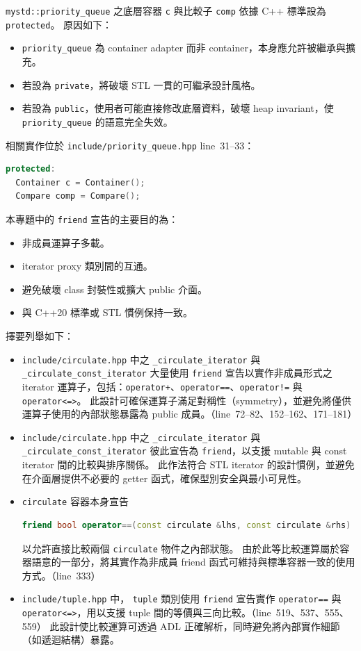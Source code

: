 \documentclass[a4paper,12pt]{article}
\begin{document}
\label{2-A-3-3}
\verb|mystd::priority_queue| 之底層容器 \verb|c| 與比較子 \verb|comp| 依據 C++ 標準設為 \verb|protected|。
原因如下：
\begin{itemize}
\item \verb|priority_queue| 為 container adapter 而非 container，本身應允許被繼承與擴充。
\item 若設為 \verb|private|，將破壞 STL 一貫的可繼承設計風格。
\item 若設為 \verb|public|，使用者可能直接修改底層資料，破壞 heap invariant，使 \verb|priority_queue| 的語意完全失效。
\end{itemize}
相關實作位於 \verb|include/priority_queue.hpp| line~31--33：
\begin{lstlisting}[language=C++]
protected:
  Container c = Container();
  Compare comp = Compare();
\end{lstlisting}
本專題中的 \verb|friend| 宣告的主要目的為：
\begin{itemize}
\item 非成員運算子多載。
\item iterator proxy 類別間的互通。
\item 避免破壞 class 封裝性或擴大 public 介面。
\item 與 C++20 標準或 STL 慣例保持一致。
\end{itemize}
擇要列舉如下：
\begin{itemize}
\item \verb|include/circulate.hpp| 中之 \verb|_circulate_iterator| 與 \verb|_circulate_const_iterator| 大量使用 \verb|friend| 宣告以實作非成員形式之 iterator 運算子，包括：\verb|operator+|、\verb|operator==|、\verb|operator!=| 與 \verb|operator<=>|。  此設計可確保運算子滿足對稱性（symmetry），並避免將僅供運算子使用的內部狀態暴露為 public 成員。（line~72--82、152--162、171--181）
\item \verb|include/circulate.hpp| 中之 \verb|_circulate_iterator| 與 \verb|_circulate_const_iterator| 彼此宣告為 \verb|friend|，以支援 mutable 與 const iterator 間的比較與排序關係。  此作法符合 STL iterator 的設計慣例，並避免在介面層提供不必要的 getter 函式，確保型別安全與最小可見性。
\item \verb|circulate| 容器本身宣告
\begin{lstlisting}[language=C++]
friend bool operator==(const circulate &lhs, const circulate &rhs)
\end{lstlisting}
以允許直接比較兩個 \verb|circulate| 物件之內部狀態。  由於此等比較運算屬於容器語意的一部分，將其實作為非成員 friend 函式可維持與標準容器一致的使用方式。（line~333）
\item \verb|include/tuple.hpp| 中，
\verb|tuple| 類別使用 \verb|friend| 宣告實作
\verb|operator==| 與 \verb|operator<=>|，用以支援 tuple 間的等價與三向比較。（line~519、537、555、559）  此設計使比較運算可透過 ADL 正確解析，同時避免將內部實作細節（如遞迴結構）暴露。
\end{itemize}
\end{document}
